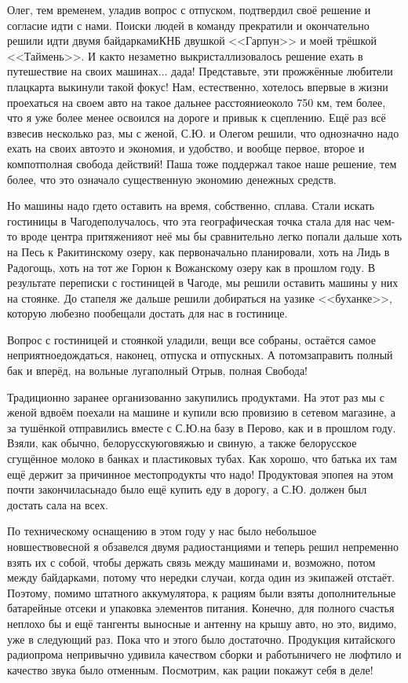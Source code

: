 Олег, тем временем, уладив вопрос с отпуском, подтвердил своё решение и согласие идти с нами. Поиски людей в команду прекратили и окончательно решили идти двумя байдарками\mdash КНБ двушкой <<Гарпун>> и моей трёшкой <<Таймень>>. И как\sdash то незаметно выкристаллизовалось решение ехать в путешествие на своих машинах$\ldots$ да\sdash да! Представьте, эти прожжённые любители плацкарта выкинули такой фокус! Нам, естественно, хотелось впервые в жизни проехаться на своем авто на такое дальнее расстояние\mdash около 750 км, тем более, что я уже более менее освоился на дороге и привык к сцеплению. Ещё раз всё взвесив несколько раз, мы с женой, С.Ю. и Олегом решили, что однозначно надо ехать на своих авто\mdash это и экономия, и удобство, и вообще первое, второе и компот\mdash полная свобода действий! Паша тоже поддержал такое наше решение, тем более, что это означало существенную экономию денежных средств. 

Но машины надо где\sdash то оставить на время, собственно, сплава. Стали искать гостиницы в Чагоде\mdash получалось, что эта географическая точка стала для нас чем-то вроде центра притяжения\mdash от неё мы бы сравнительно легко попали дальше хоть на Песь к Ракитинскому озеру, как первоначально планировали, хоть на Лидь в Радогощь, хоть на тот же Горюн к Вожанскому озеру как в прошлом году. В результате переписки с гостиницей в Чагоде, мы решили оставить машины у них на стоянке. До стапеля же дальше решили добираться на уазике <<буханке>>, которую любезно пообещали достать для нас в гостинице. 

Вопрос с гостиницей и стоянкой уладили, вещи все собраны, остаётся самое неприятное\mdash дождаться, наконец, отпуска и отпускных. А потом\mdash заправить полный бак и вперёд, на вольные луга\mdash полный Отрыв, полная Свобода! 

Традиционно заранее организованно закупились продуктами. На этот раз мы с женой вдвоём поехали на машине и купили всю провизию в сетевом магазине, а за тушёнкой отправились вместе с С.Ю.\mdash на базу в Перово, как и в прошлом году. Взяли, как обычно, белорусскую\mdash говяжью и свиную, а также белорусское сгущённое молоко в банках и пластиковых тубах. Как хорошо, что батька их там ещё держит за причинное место\mdash продукты что надо! Продуктовая эпопея на этом почти закончилась\mdash надо было ещё купить еду в дорогу, а С.Ю. должен был достать сала на всех.

По техническому оснащению в этом году у нас было небольшое новшество\mdash весной я обзавелся двумя радиостанциями и теперь решил непременно взять их с собой, чтобы держать связь между машинами и, возможно, потом между байдарками, потому что нередки случаи, когда один из экипажей отстаёт. Поэтому, помимо штатного аккумулятора, к рациям были взяты дополнительные батарейные отсеки и упаковка элементов питания. Конечно, для полного счастья неплохо бы и ещё тангенты выносные и антенну на крышу авто, но это, видимо, уже в следующий раз. Пока что и этого было достаточно. Продукция китайского радиопрома непривычно удивила качеством сборки и работы\mdash ничего не люфтило и качество звука было отменным. Посмотрим, как рации покажут себя в деле!

